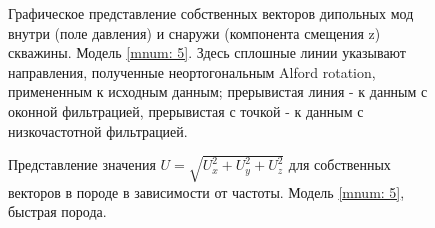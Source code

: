 \begin{figure}[h]
\begin{minipage}{0.24\linewidth}
\end{minipage}
\hfill
\begin{minipage}{0.24\linewidth}
\end{minipage}
\begin{minipage}{0.24\linewidth}
\end{minipage}
\begin{minipage}{0.24\linewidth}
\end{minipage}
\begin{minipage}{0.24\linewidth}
\end{minipage}
\hfill

\caption{Графическое представление собственных векторов дипольных мод внутри (поле давления) и снаружи (компонента смещения z) скважины. Модель \ref{mnum: 5}. Здесь сплошные линии указывают направления, полученные неортогональным Alford rotation, примененным к исходным данным; прерывистая линия - к данным с оконной фильтрацией, прерывистая с точкой - к данным с низкочастотной фильтрацией.}
\end{figure}

\begin{figure}[h]
\centering
	\caption{Представление значения $U = \sqrt{U_x^2+U_y^2+U_z^2}$ для собственных векторов в породе в зависимости от частоты. Модель \ref{mnum: 5}, быстрая порода. }
\end{figure}

